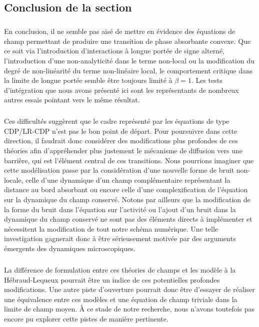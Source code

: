 \subsection{Conclusion de la section}

\subparagraph{}En conclusion, il ne semble pas aisé de mettre en évidence des équations de champ permettant de produire une transition de phase absorbante convexe. Que ce soit via l'introduction d'interactions à longue portée de signe alterné, l'introduction d'une non-analyticité dans le terme non-local ou la modification du degré de non-linéarité du terme non-linéaire local, le comportement critique dans la limite de longue portée semble être toujours limité à $\beta = 1$. Les tests d'intégration que nous avons présenté ici sont les représentants de nombreux autres essais pointant vers le même résultat. 

\subparagraph{}Ces difficultés suggèrent que le cadre représenté par les équations de type CDP/LR-CDP n'est pas le bon point de départ. Pour poursuivre dans cette direction, il faudrait donc considérer des modifications plus profondes de ces théories afin d'appréhender plus justement le mécanisme de diffusion vers une barrière, qui est l'élément central de ces transitions. Nous pourrions imaginer que cette modélisation passe par la considération d'une nouvelle forme de bruit non-locale, celle d'une dynamique d'un champ complémentaire représentant la distance au bord absorbant ou encore celle d'une complexification de l'équation sur la dynamique du champ conservé. Notons par ailleurs que la modification de la forme du bruit dans l'équation sur l'activité ou l'ajout d'un bruit dans la dynamique du champ conservé ne sont pas des éléments directs à implémenter et nécessitent la modification de tout notre schéma numérique. Une telle investigation gagnerait donc à être sérieusement motivée par des arguments émergents des dynamiques microscopiques.

\subparagraph{}La différence de formulation entre ces théories de champs et les modèle à la Hébraud-Lequeux pourrait être un indice de ces potentielles profondes modifications. Une autre piste d'ouverture pourrait donc être d'essayer de réaliser une équivalence entre ces modèles et une équation de champ triviale dans la limite de champ moyen. \`A ce stade de notre recherche, nous n'avons toutefois pas encore pu explorer cette pistes de manière pertinente.

\resumetocwriting